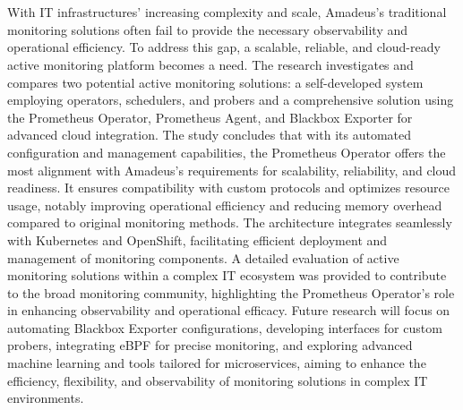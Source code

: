 \chapter{\abstractname}


With IT infrastructures' increasing complexity and scale, Amadeus's traditional monitoring solutions often fail to provide the necessary observability and operational efficiency. To address this gap, a scalable, reliable, and cloud-ready active monitoring platform becomes a need. The research investigates and compares two potential active monitoring solutions: a self-developed system employing operators, schedulers, and probers and a comprehensive solution using the Prometheus Operator, Prometheus Agent, and Blackbox Exporter for advanced cloud integration. The study concludes that with its automated configuration and management capabilities, the Prometheus Operator offers the most alignment with Amadeus's requirements for scalability, reliability, and cloud readiness. It ensures compatibility with custom protocols and optimizes resource usage, notably improving operational efficiency and reducing memory overhead compared to original monitoring methods. The architecture integrates seamlessly with Kubernetes and OpenShift, facilitating efficient deployment and management of monitoring components. A detailed evaluation of active monitoring solutions within a complex IT ecosystem was provided to contribute to the broad monitoring community, highlighting the Prometheus Operator's role in enhancing observability and operational efficacy. Future research will focus on automating Blackbox Exporter configurations, developing interfaces for custom probers, integrating eBPF for precise monitoring, and exploring advanced machine learning and tools tailored for microservices, aiming to enhance the efficiency, flexibility, and observability of monitoring solutions in complex IT environments. 